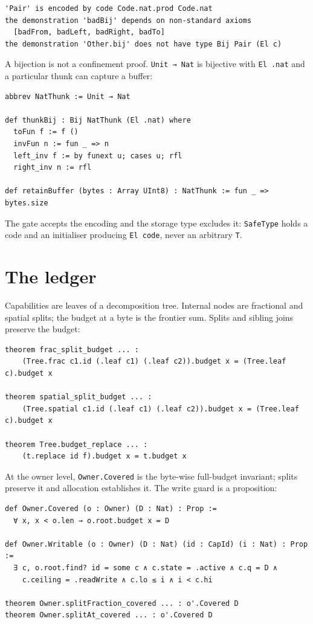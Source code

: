 \documentclass[10pt,a4paper]{article}
\newcommand{\file}[1]{\texttt{\small #1}}
\begin{document}
\begin{lstlisting}[style=out]
'Pair' is encoded by code Code.nat.prod Code.nat
the demonstration 'badBij' depends on non-standard axioms
  [badFrom, badLeft, badRight, badTo]
the demonstration 'Other.bij' does not have type Bij Pair (El c)
\end{lstlisting}

A bijection is not a confinement proof. \texttt{Unit → Nat} is bijective with
\texttt{El .nat} and a particular thunk can capture a buffer:

\begin{lstlisting}[caption={\file{bench/NatThunkAdmission.lean}.}]
abbrev NatThunk := Unit → Nat

def thunkBij : Bij NatThunk (El .nat) where
  toFun f := f ()
  invFun n := fun _ => n
  left_inv f := by funext u; cases u; rfl
  right_inv n := rfl

def retainBuffer (bytes : Array UInt8) : NatThunk := fun _ => bytes.size
\end{lstlisting}

The gate accepts the encoding and the storage type excludes it: \texttt{SafeType}
holds a code and an initialiser producing \texttt{El code}, never an arbitrary
\texttt{T}.

\section{The ledger}

Capabilities are leaves of a decomposition tree. Internal nodes are fractional and
spatial splits; the budget at a byte is the frontier sum. Splits and sibling joins
preserve the budget:

\begin{lstlisting}[caption={\file{Cap/Ledger.lean}.}]
theorem frac_split_budget ... :
    (Tree.frac c1.id (.leaf c1) (.leaf c2)).budget x = (Tree.leaf c).budget x

theorem spatial_split_budget ... :
    (Tree.spatial c1.id (.leaf c1) (.leaf c2)).budget x = (Tree.leaf c).budget x

theorem Tree.budget_replace ... :
    (t.replace id f).budget x = t.budget x
\end{lstlisting}

At the owner level, \texttt{Owner.Covered} is the byte-wise full-budget invariant;
splits preserve it and allocation establishes it. The write guard is a
proposition:

\begin{lstlisting}[caption={\file{Cap/Ledger.lean}: coverage and guards.}]
def Owner.Covered (o : Owner) (D : Nat) : Prop :=
  ∀ x, x < o.len → o.root.budget x = D

def Owner.Writable (o : Owner) (D : Nat) (id : CapId) (i : Nat) : Prop :=
  ∃ c, o.root.find? id = some c ∧ c.state = .active ∧ c.q = D ∧
    c.ceiling = .readWrite ∧ c.lo ≤ i ∧ i < c.hi

theorem Owner.splitFraction_covered ... : o'.Covered D
theorem Owner.splitAt_covered ... : o'.Covered D
\end{lstlisting}
\end{document}
